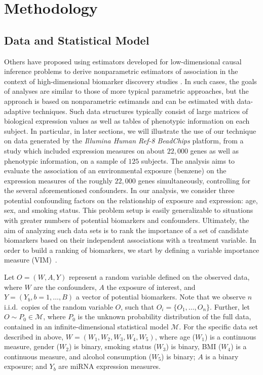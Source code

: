 \chapter{Methodology}

\section{Data and Statistical Model}\label{data}

Others have proposed using estimators developed for low-dimensional causal
inference problems to derive nonparametric estimators of association in the
context of high-dimensional biomarker discovery studies
\cite{tuglus2011targeted}. In such cases, the goals of analyses are similar to
those of more typical parametric approaches, but the approach is based on
nonparametric estimands and can be estimated with data-adaptive techniques. Such
data structures typically consist of large matrices of biological expression
values as well as tables of phenotypic information on each subject. In
particular, in later sections, we will illustrate the use of our technique on
data generated by the \textit{Illumina Human Ref-8 BeadChips} platform, from a
study which included expression measures on about $22,000$ genes as well as
phenotypic information, on a sample of $125$ subjects. The analysis aims to
evaluate the association of an environmental exposure (benzene) on the
expression measures of the roughly $22,000$ genes simultaneously, controlling
for the several aforementioned confounders. In our analysis, we consider three
potential confounding factors on the relationship of exposure and expression:
age, sex, and smoking status. This problem setup is easily generalizable to
situations with greater numbers of potential biomarkers and confounders.
Ultimately, the aim of analyzing such data sets is to rank the importance of a
set of candidate biomarkers based on their independent associations with a
treatment variable. In order to build a ranking of biomarkers, we start by
defining a variable importance measure (VIM)~\cite{van2011targeted}.

Let $O = (W, A, Y)$ represent a random variable defined on the observed data,
where $W$ are the confounders, $A$ the exposure of interest, and
$Y = (Y_b, b = 1, \dots, B)$ a vector of potential biomarkers. Note that we
observe $n$ i.i.d.~copies of the random variable $O$, such that
$O_i = \{O_1, \dots, O_n\}$. Further, let $O \sim P_0 \in \mathscr{M}$, where
$P_{0}$ is the unknown probability distribution of the full data, contained in
an infinite-dimensional statistical model $\mathscr{M}$. For the specific data
set described in above, $W = (W_{1}, W_{2}, W_{3}, W_{4}, W_{5})$, where age
($W_{1}$) is a continuous measure, gender ($W_{2}$) is binary, smoking status
($W_{3}$) is binary, BMI ($W_{4}$) is a continuous measure, and alcohol
consumption ($W_{5}$) is binary; $A$ is a binary exposure; and $Y_{b}$ are miRNA
expression measures.

